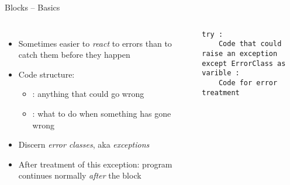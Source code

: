 \begin{frame}[fragile]{ Blocks -- Basics}
%
\begin{columns}[T]
\begin{itemize}
\item Sometimes easier to \emph{react} to errors than to catch them before they happen
\item Code structure:
	\begin{itemize}
	\item {}: anything that could go wrong
	\item {}: what to do when something has gone wrong
	\end{itemize}
\item Discern \emph{error classes}, aka \emph{exceptions}
\item After treatment of this exception: program continues normally \emph{after} the block
\end{itemize}
%
\vspace{-6pt}
\begin{codebox}
\begin{verbatim}
try :
    Code that could raise an exception
except ErrorClass as varible :
    Code for error treatment
\end{verbatim}
\end{codebox}
\end{columns}
%
\end{frame}


